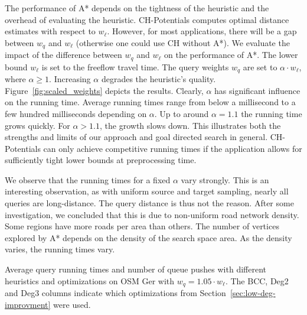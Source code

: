 \documentclass[manuscript,review]{acmart}
\begin{document}
The performance of A* depends on the tightness of the heuristic and the overhead of evaluating the heuristic.
CH-Potentials computes optimal distance estimates with respect to $w_\ell$.
However, for most applications, there will be a gap between $w_q$ and $w_\ell$ (otherwise one could use CH without A*).
We evaluate the impact of the difference between $w_q$ and $w_\ell$ on the performance of A*.
The lower bound $w_\ell$ is set to the freeflow travel time.
The query weights $w_q$ are set to $\alpha \cdot w_\ell$, where $\alpha\ge 1$.
Increasing $\alpha$ degrades the heuristic's quality.
Figure~\ref{fig:scaled_weights} depicts the results.
Clearly, $\alpha$ has significant influence on the running time.
Average running times range from below a millisecond to a few hundred milliseconds depending on $\alpha$.
Up to around $\alpha = 1.1$ the running time grows quickly.
For $\alpha > 1.1$, the growth slows down.
This illustrates both the strengths and limits of our approach and goal directed search in general.
CH-Potentials can only achieve competitive running times if the application allows for sufficiently tight lower bounds at preprocessing time.

We observe that the running times for a fixed $\alpha$ vary strongly.
This is an interesting observation, as with uniform source and target sampling, nearly all queries are long-distance.
The query distance is thus not the reason.
After some investigation, we concluded that this is due to non-uniform road network density.
Some regions have more roads per area than others.
The number of vertices explored by A* depends on the density of the search space area.
As the density varies, the running times vary.

\begin{table}
\centering
\caption{
Average query running times and number of queue pushes with different heuristics and optimizations on OSM Ger with $w_q = 1.05 \cdot w_\ell$.
The BCC, Deg2 and Deg3 columns indicate which optimizations from Section~\ref{sec:low-deg-improvment} were used.
}\label{tab:building_blocks} %

\end{table}
\end{document}
